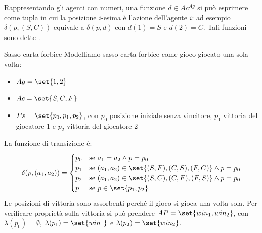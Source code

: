 \begin{note}{}
  Rappresentando gli agenti con numeri, una funzione \(d \in Ac^{Ag}\) si può esprimere come tupla in cui la posizione \(i\)-esima è l'azione dell'agente \(i\): ad esempio \(\delta(p,(S,C))\) equivale a \(\delta(p, d)\) con \(d(1) = S\) e \(d(2) = C\). Tali funzioni sono dette .
\end{note}

\begin{example}{Sasso-carta-forbice}
  Modelliamo sasso-carta-forbice come gioco giocato una sola volta:
  \begin{itemize}
    \item \(Ag = \set{1,2}\)
    \item \(Ac = \set{S,C,F}\)
    \item \(Ps = \set{p_0, p_1, p_2}\), con \(p_0\) posizione iniziale senza vincitore, \(p_1\) vittoria del giocatore 1 e \(p_2\) vittoria del giocatore 2
  \end{itemize}
  La funzione di transizione è:
  \[\delta(p,(a_1,a_2)) = \begin{cases}
      p_0 & \text{se } a_1 = a_2 \land p = p_0                                 \\
      p_1 & \text{se } (a_1,a_2) \in \set{(S,F),(C,S),(F,C)} \land p = p_0     \\
      p_2 & \text{se } (a_1,a_2) \in \set{(S,C),(C,F),(F,S)} \land p = p_0     \\
      p   & \text{se } p \in \set{p_1,p_2}
    \end{cases}\]
  Le posizioni di vittoria sono assorbenti perché il gioco si gioca una volta sola. Per verificare proprietà sulla vittoria si può prendere \(AP = \set{{win}_1, {win}_2}\), con \(\lambda(p_0) = \emptyset\), \(\lambda(p_1) = \set{{win}_1}\) e \(\lambda(p_2) = \set{{win}_2}\).
  \begin{figure}[H]
    \centering
\end{figure}
\end{example}
